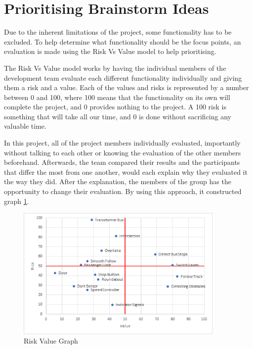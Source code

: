 \section{Prioritising Brainstorm Ideas}

Due to the inherent limitations of the project, some functionality has to be excluded. To help determine what functionality should be the focus points, an evaluation is made using the Risk Vs Value model to help prioritising.

The Risk Vs Value model works by having the individual members of the development team evaluate each different functionality individually and giving them a risk and a value. Each of the values and risks is represented by a number between 0 and 100, where 100 means that the functionality on its own will complete the project, and 0 provides nothing to the project. A 100 risk is something that will take all our time, and 0 is done without sacrificing any valuable time. 

In this project, all of the project members individually evaluated, importantly without talking to each other or knowing the evaluation of the other members beforehand. Afterwards, the team compared their results and the participants that differ the most from one another, would each explain why they evaluated it the way they did. After the explanation, the members of the group has the opportunity to change their evaluation. By using this approach, it constructed graph \ref{fig:RiskValueGraph}.

\begin{figure}[!h]
    \centering
	\includegraphics[width=0.9\textwidth]{Images/Graphs/RiskValue.png}
    \caption{Risk Value Graph}
    \label{fig:RiskValueGraph}
\end{figure}

